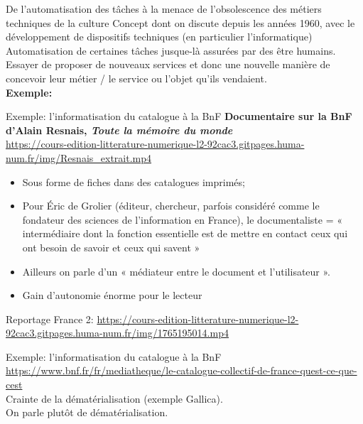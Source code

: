 \begin{frame}{De l'automatisation des tâches à la menace de l'obsolescence des métiers techniques de la culture}
    Concept dont on discute depuis les années 1960, avec le développement de dispositifs techniques (en particulier l'informatique) \textrightarrow{} Automatisation de certaines tâches jusque-là assurées par des être humains.\\
    \vspace{1em}
Essayer de proposer de nouveaux services et donc une nouvelle manière de concevoir leur métier / le service ou l'objet qu'ils vendaient.\\
\textbf{Exemple:  }\\

\end{frame}

\begin{frame}{Exemple: l'informatisation du catalogue à la BnF}
    \textbf{Documentaire sur la BnF d'Alain Resnais, \textit{Toute la mémoire du monde}}\\
    \url{https://cours-edition-litterature-numerique-l2-92cac3.gitpages.huma-num.fr/img/Resnais_extrait.mp4}\\
    \vspace{1em}
    \pause
    \begin{itemize}
        \item Sous forme de fiches dans des catalogues imprimés;
        \item Pour Éric de Grolier (éditeur, chercheur, parfois considéré comme le fondateur des sciences de l'information en France), le documentaliste = « intermédiaire dont la fonction essentielle est de mettre en contact ceux qui ont besoin de savoir et ceux qui savent »
        \item Ailleurs on parle d’un « médiateur entre le document et l’utilisateur ».
        \item Gain d'autonomie énorme pour le lecteur
    \end{itemize}
    Reportage France 2: \url{https://cours-edition-litterature-numerique-l2-92cac3.gitpages.huma-num.fr/img/1765195014.mp4}
\end{frame}

\begin{frame}{Exemple: l'informatisation du catalogue à la BnF}
    \url{https://www.bnf.fr/fr/mediatheque/le-catalogue-collectif-de-france-quest-ce-que-cest}\\
    \vspace{1em}
    \textrightarrow{} Crainte de la dématérialisation (exemple Gallica).\\
    \textrightarrow{} On parle plutôt de dématérialisation.
\end{frame}